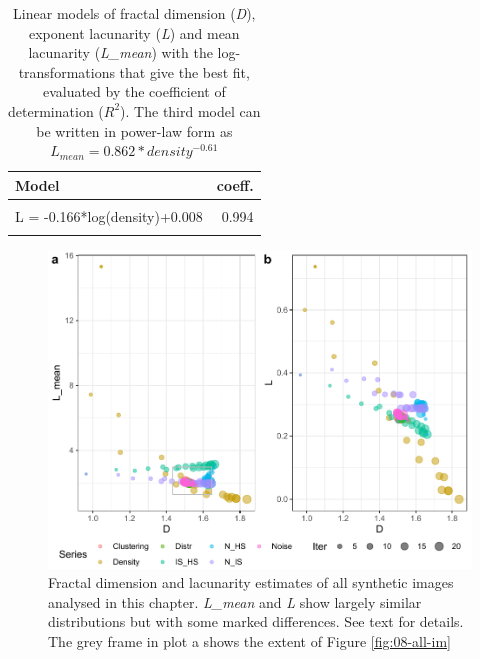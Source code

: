 \documentclass[
  12pt,
  a4paper, twoside]{book}
\begin{document}
\begin{table}

\caption[Models of fractal dimension and lacunarity values expected from density]{\label{tab:08-models-tab}Linear models of fractal dimension (\emph{D}), exponent lacunarity (\emph{L}) and mean lacunarity (\emph{L\_mean}) with the log-transformations that give the best fit, evaluated by the coefficient of determination (\(R^2\)). The third model can be written in power-law form as \(L_{mean} = 0.862*density^{-0.61}\)}
\centering
\begin{tabular}[t]{lr}
\toprule
Model & coeff.\\
\midrule
\cellcolor{gray!6}{D = 0.188*log(density)+1.792} & \cellcolor{gray!6}{0.931}\\
L = -0.166*log(density)+0.008 & 0.994\\
\cellcolor{gray!6}{log(L\_mean) = -0.610*log(density)-0.148} & \cellcolor{gray!6}{0.995}\\
\bottomrule
\end{tabular}
\end{table}



\begin{figure}

{\centering \includegraphics[width=0.9\linewidth]{bookdown-demo_files/figure-latex/08-all-1} 

}

\caption[D and L estimates of all synthetic images]{Fractal dimension and lacunarity estimates of all synthetic images analysed in this chapter. \emph{L\_mean} and \emph{L} show largely similar distributions but with some marked differences. See text for details. The grey frame in plot a shows the extent of Figure \ref{fig:08-all-im}}\label{fig:08-all}
\end{figure}
\end{document}
